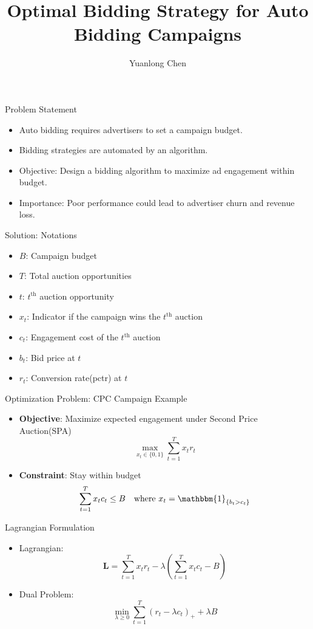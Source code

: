 \documentclass{beamer}
\title{Optimal Bidding Strategy for Auto Bidding Campaigns}
\author{Yuanlong Chen}
\date{}
\begin{document}
	
	\frame{\titlepage}
	
	\begin{frame}{Problem Statement}
		\begin{itemize}
			\item Auto bidding requires advertisers to set a campaign budget.
			\item Bidding strategies are automated by an algorithm.
			\item Objective: Design a bidding algorithm to maximize ad engagement within budget.
			\item Importance: Poor performance could lead to advertiser churn and revenue loss.
		\end{itemize}
	\end{frame}
	
	\begin{frame}{Solution: Notations}
		\begin{itemize}
			\item $B$: Campaign budget
			\item $T$: Total auction opportunities
			\item $t$: $t^{\text{th}}$ auction opportunity
			\item $x_t$: Indicator if the campaign wins the $t^{\text{th}}$ auction
			\item $c_t$: Engagement cost of the $t^{\text{th}}$ auction
			\item $b_t$: Bid price at $t$
			\item $r_t$: Conversion rate(pctr) at $t$
		\end{itemize}
	\end{frame}
	
	\begin{frame}{Optimization Problem: CPC Campaign Example}
		\begin{itemize}
			\item \textbf{Objective}: Maximize expected engagement under Second Price Auction(SPA)
			\[
			\max_{x_t \in  \{0, 1 \}}  \sum_{t=1}^T x_t r_t 
			\]
			\item \textbf{Constraint}: Stay within budget
			\[
			\sum_{t=1}^T x_t c_t \leq B \quad \text{where } x_t = \mathbbm{1}_{ \{b_t > c_t\} }
			\]
		\end{itemize}
	\end{frame}
	
	\begin{frame}{Lagrangian Formulation}
		\begin{itemize}
			\item Lagrangian:
			\[
			\mathbf{L} = \sum_{t=1}^T x_t r_t - \lambda \left( \sum_{t=1}^T x_t c_t - B \right)
			\]
			\item Dual Problem:
			\[
			\min_{\lambda \geq 0} \sum_{t=1}^T \left( r_t  - \lambda c_t \right)_{+} + \lambda B
			\]
		\end{itemize}
	\end{frame}
	
\end{document}

